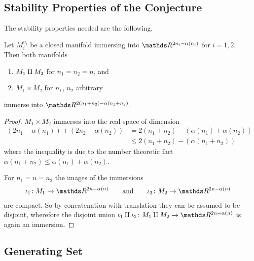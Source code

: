 \subsection{Stability Properties of the Conjecture}
The stability properties needed are the following.
\begin{Lem}\label{lem:brownstableunderringops}
  Let $M_i^{n_i}$ be a closed manifold immersing into
  $\R^{2n_i-\alpha(n_i)}$ for $i=1,2$.
  Then both manifolds
  \begin{enumerate}
  \item $M_1\amalg M_2$ for $n_1=n_2=n$, and
  \item $M_1\times M_2$ for $n_1$, $n_2$ arbitrary
  \end{enumerate}
  immerse into $\R^{2(n_1+n_2)-\alpha(n_1+n_2)}$.
  \begin{proof}
    $M_1\times M_2$ immerses into the real space of dimension
    \begin{align*}
      \left( 2n_1-\alpha(n_1) \right)
      + \left( 2n_2-\alpha(n_2) \right)
      &= 2(n_1+n_2) - \left(\alpha(n_1)+\alpha(n_2)\right)\\
      &\leq 2(n_1+n_2) - \left(\alpha(n_1 + n_2)\right)
    \end{align*}
    where the inequality is due to the number theoretic fact
    $\alpha(n_1+n_2) \leq \alpha(n_1)+\alpha(n_2)$.

    For $n_1=n=n_2$ the images of the immersions
    \begin{gather*}
      \iota_1\colon M_1\to\R^{2n-\alpha(n)}
      \qquad \text{and} \qquad
      \iota_2\colon M_2\to\R^{2n-\alpha(n)}
    \end{gather*}
    are compact. So by
    concatenation with translation they can be assumed to be disjoint,
    wherefore the disjoint union
    $\iota_1\disjointsum\iota_2\colon M_1\disjointsum M_2\to\R^{2n-\alpha(n)}$
    is again an immersion.
  \end{proof}
\end{Lem}

\subsection{Generating Set}
